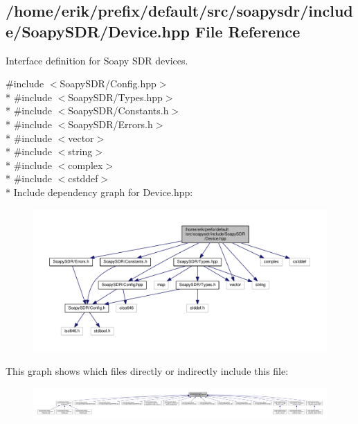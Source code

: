 \subsection{/home/erik/prefix/default/src/soapysdr/include/\+Soapy\+S\+D\+R/\+Device.hpp File Reference}
\label{Device_8hpp}


Interface definition for Soapy S\+DR devices.  


{\ttfamily \#include $<$Soapy\+S\+D\+R/\+Config.\+hpp$>$}\\*
{\ttfamily \#include $<$Soapy\+S\+D\+R/\+Types.\+hpp$>$}\\*
{\ttfamily \#include $<$Soapy\+S\+D\+R/\+Constants.\+h$>$}\\*
{\ttfamily \#include $<$Soapy\+S\+D\+R/\+Errors.\+h$>$}\\*
{\ttfamily \#include $<$vector$>$}\\*
{\ttfamily \#include $<$string$>$}\\*
{\ttfamily \#include $<$complex$>$}\\*
{\ttfamily \#include $<$cstddef$>$}\\*
Include dependency graph for Device.\+hpp\+:
\nopagebreak
\begin{figure}[H]
\begin{center}
\leavevmode
\includegraphics[width=350pt]{d6/d20/Device_8hpp__incl}
\end{center}
\end{figure}
This graph shows which files directly or indirectly include this file\+:
\nopagebreak
\begin{figure}[H]
\begin{center}
\leavevmode
\includegraphics[width=350pt]{d1/d79/Device_8hpp__dep__incl}
\end{center}
\end{figure}
